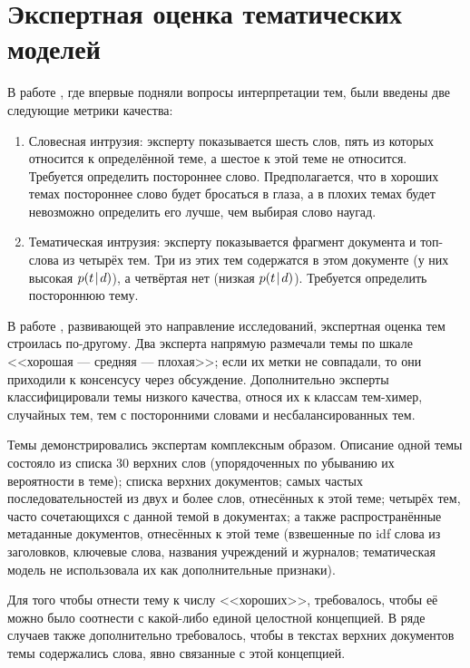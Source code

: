\section{Экспертная оценка тематических моделей}

В работе \cite{rtl}, где впервые подняли вопросы интерпретации тем, были введены две следующие метрики качества:

\begin{enumerate}
\item{Словесная интрузия: эксперту показывается шесть слов, пять из которых относится к определённой теме, а шестое к этой теме не относится. Требуется определить постороннее слово. Предполагается, что в хороших темах постороннее слово будет бросаться в глаза, а в плохих темах будет невозможно определить его лучше, чем выбирая слово наугад.}
\item{Тематическая интрузия: эксперту показывается фрагмент документа и топ-слова из четырёх тем. Три из этих тем содержатся в этом документе (у них высокая $p(t\mspace{2mu}{|}\mspace{2mu} d)$), а четвёртая нет (низкая $p(t\mspace{2mu}{|}\mspace{2mu} d)$). Требуется определить постороннюю тему.}
\end{enumerate}

В работе \cite{mimno2011}, развивающей это направление исследований, экспертная оценка тем строилась по-другому. Два эксперта напрямую размечали темы по шкале <<хорошая --- средняя --- плохая>>; если их метки не совпадали, то они приходили к консенсусу через обсуждение. Дополнительно эксперты классифицировали темы низкого качества, относя их к классам тем-химер, случайных тем, тем с посторонними словами и несбалансированных тем.

Темы демонстрировались экспертам комплексным образом. Описание одной темы состояло из списка 30 верхних слов (упорядоченных по убыванию их вероятности в теме); списка верхних документов; самых частых последовательностей из двух и более слов, отнесённых к этой теме; четырёх тем, часто сочетающихся с данной темой в документах; а также распространённые метаданные документов, отнесённых к этой теме (взвешенные по idf слова из заголовков, ключевые слова, названия учреждений и журналов; тематическая модель не использовала их как дополнительные признаки).

Для того чтобы отнести тему к числу <<хороших>>, требовалось, чтобы её можно было соотнести с какой-либо единой целостной концепцией. В ряде случаев также дополнительно требовалось, чтобы в текстах верхних документов темы содержались слова, явно связанные с этой концепцией.

